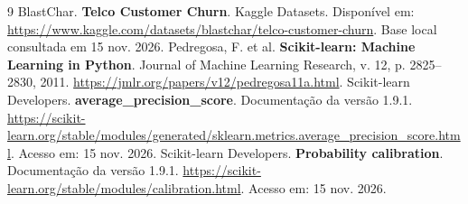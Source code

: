 \documentclass[12pt]{article}
\begin{document}
\begin{thebibliography}{9}
 BlastChar. \textbf{Telco Customer Churn}. Kaggle Datasets. Disponível em: \url{https://www.kaggle.com/datasets/blastchar/telco-customer-churn}. Base local consultada em 15 nov. 2026.
 Pedregosa, F. et al. \textbf{Scikit-learn: Machine Learning in Python}. Journal of Machine Learning Research, v. 12, p. 2825--2830, 2011. \url{https://jmlr.org/papers/v12/pedregosa11a.html}.
 Scikit-learn Developers. \textbf{average\_precision\_score}. Documentação da versão 1.9.1. \url{https://scikit-learn.org/stable/modules/generated/sklearn.metrics.average_precision_score.html}. Acesso em: 15 nov. 2026.
 Scikit-learn Developers. \textbf{Probability calibration}. Documentação da versão 1.9.1. \url{https://scikit-learn.org/stable/modules/calibration.html}. Acesso em: 15 nov. 2026.
\end{thebibliography}
\end{document}
